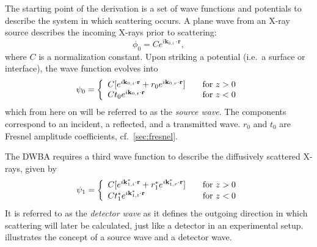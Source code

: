 \documentclass[10pt,twoside, b5paper,pdftex]{report}
\begin{document}

The starting point of the derivation is a set of wave functions and potentials to describe the system in which scattering occurs. A plane wave from an X-ray source describes the incoming X-rays prior to scattering:
\begin{equation}\label{eq:phi0}
\phi_{0} = Ce^{i\mathbf{k}_{0,i}\cdot\mathbf{r}},
\end{equation}
where $C$ is a normalization constant. Upon striking a potential (i.e.~a surface or interface), the wave function evolves into  
%
\begin{equation}
\psi_{0} = \left\{
  \begin{array}{l l}
    C[e^{i\mathbf{k}_{0,i}\cdot\mathbf{r}} + r_{0}e^{i\mathbf{k}_{0,r}\cdot\mathbf{r}}] & \quad \mbox{for } z > 0\\
    Ct_{0}e^{i\mathbf{k}_{0,t}\cdot\mathbf{r}} & \quad \mbox{for } z < 0\\
  \end{array} \right.
\end{equation}
which from here on will be referred to as the {\it source wave}. The components correspond to an incident, a reflected, and a transmitted wave. $r_0$ and $t_0$ are Fresnel amplitude coefficients, cf.~\cref{sec:fresnel}.

 The DWBA requires a third wave function to describe the diffusively scattered X-rays, given by
\begin{equation}
\psi_{1} = \left\{
  \begin{array}{l l}
    C[e^{i\mathbf{k}_{1,i}^{*}\cdot\mathbf{r}} + r_{1}^{*}e^{i\mathbf{k}_{1,r}^{*}\cdot\mathbf{r}}] & \quad \mbox{for } z > 0\\
    Ct_{1}^{*}e^{i\mathbf{k}_{1,t}^{*}\cdot\mathbf{r}} & \quad \mbox{for } z < 0\\
  \end{array} \right.
\end{equation}
It is referred to as the {\it detector wave} as it defines the outgoing direction in which scattering will later be calculated, just like a detector in an experimental setup.   illustrates the concept of a source wave and a detector wave.
%
\end{document}
